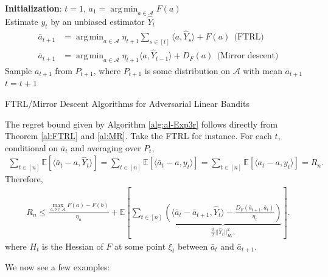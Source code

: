 \documentclass[letterpaper,11pt,openright,openany]{book}
\numberwithin{equation}{section}
\theoremstyle{plain}
\theoremstyle{definition}
\def\E{{\mathbb E}}
\DeclareMathOperator*{\argmin}{arg\,min}
\begin{document}
\begin{algorithm}[H]
 \begin{algorithmic}[1]
 \STATE\textbf{Initialization}: $t=1$, $a_1=\argmin_{a\in\mathcal A}F(a)$\\
\STATE Estimate $y_t$ by an unbiased estimator $\hat{Y}_t$ 
\STATE \begin{align*}
\bar{a}_{t+1}&=\argmin_{a\in\mathcal A}\eta_{t+1}\sum_{s\in [t]}\langle a, \hat{Y}_s\rangle+F(a)\ \ \text{(FTRL)}\\
\bar{a}_{t+1}&=\argmin_{a\in\mathcal A}\eta_{t+1}\langle a, \hat{Y}_{t-1}\rangle+D_{F}(a)\ \ \text{(Mirror descent)}
\end{align*}
\STATE Sample $a_{t+1}$ from $P_{t+1}$, where $P_{t+1}$ is some distribution on $\mathcal A$ with mean $\bar{a}_{t+1}$
\STATE $t = t +1$ 
\ENDWHILE
\end{algorithmic}
\caption{FTRL/Mirror Descent Algorithms for Adversarial Linear Bandits} 
\label{alg:al-Exp3r}
\end{algorithm}

The regret bound given by Algorithm \ref{alg:al-Exp3r} follows directly from Theorem \ref{al:FTRL} and \ref{al:MR}. Take the FTRL for instance. For each $t$, conditional on $\bar{a}_t$ and averaging over $P_t$, 
\begin{align}
 \sum_{t\in [n]}\E[\langle \bar{a}_t-a, \hat{Y}_t\rangle]= \sum_{t\in [n]}\E[\langle \bar{a}_t-a, y_t\rangle]= \sum_{t\in [n]}\E[\langle a_t-a, y_t\rangle]=R_n.
\end{align}
Therefore,
\begin{align}
R_n\leq\frac{\max_{a,b\in\mathcal A}F(a)-F(b)}{\eta_n}+\E\left[\sum_{t\in [n]}\underbrace{\left(\langle \bar{a}_t- \bar{a}_{t+1}, \hat{Y}_t\rangle-\frac{D_F(\bar{a}_{t+1}, \bar{a}_t)}{\eta_t}\right)}_{\frac{\eta_t}{2}||\hat{Y}_t||_{H_t^{-1}}^2}\right].\label{gb}
\end{align} 
where $H_t$ is the Hessian of $F$ at some point $\xi_t$ between $\bar{a}_t$ and $\bar{a}_{t+1}$.

We now see a few examples:
\end{document}
